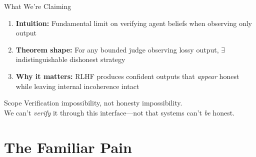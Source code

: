 \documentclass[aspectratio=169,11pt]{beamer}
\begin{document}
\begin{frame}{What We're Claiming}
    \begin{enumerate}
        \item<1-> \textbf{Intuition:} Fundamental limit on verifying agent beliefs when observing only output
        \vspace{0.5em}
        \item<2-> \textbf{Theorem shape:} For any bounded judge observing lossy output, $\exists$ indistinguishable dishonest strategy
        \vspace{0.5em}
        \item<3-> \textbf{Why it matters:} RLHF produces confident outputs that \textit{appear} honest while leaving internal incoherence intact
    \end{enumerate}

    \vspace{1em}
    \pause[4]
    \begin{block}{Scope}
        Verification impossibility, not honesty impossibility.\\
        We can't \textit{verify} it through this interface---not that systems can't \textit{be} honest.
    \end{block}

\end{frame}

\section{The Familiar Pain}
\end{document}
